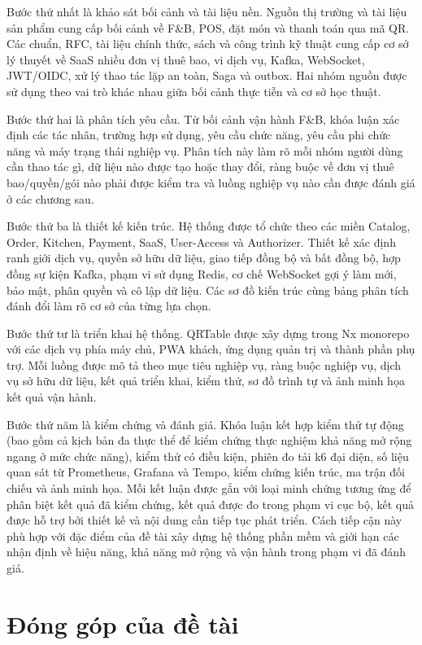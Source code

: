 Bước thứ nhất là khảo sát bối cảnh và tài liệu nền. Nguồn thị trường và tài liệu sản phẩm cung cấp bối cảnh về F\&B, POS, đặt món và thanh toán qua mã QR. Các chuẩn, RFC, tài liệu chính thức, sách và công trình kỹ thuật cung cấp cơ sở lý thuyết về SaaS nhiều đơn vị thuê bao, vi dịch vụ, Kafka, WebSocket, JWT/OIDC, xử lý thao tác lặp an toàn, Saga và outbox. Hai nhóm nguồn được sử dụng theo vai trò khác nhau giữa bối cảnh thực tiễn và cơ sở học thuật.

Bước thứ hai là phân tích yêu cầu. Từ bối cảnh vận hành F\&B, khóa luận xác định các tác nhân, trường hợp sử dụng, yêu cầu chức năng, yêu cầu phi chức năng và máy trạng thái nghiệp vụ. Phân tích này làm rõ mỗi nhóm người dùng cần thao tác gì, dữ liệu nào được tạo hoặc thay đổi, ràng buộc về đơn vị thuê bao/quyền/gói nào phải được kiểm tra và luồng nghiệp vụ nào cần được đánh giá ở các chương sau.

Bước thứ ba là thiết kế kiến trúc. Hệ thống được tổ chức theo các miền Catalog, Order, Kitchen, Payment, SaaS, User-Access và Authorizer. Thiết kế xác định ranh giới dịch vụ, quyền sở hữu dữ liệu, giao tiếp đồng bộ và bất đồng bộ, hợp đồng sự kiện Kafka, phạm vi sử dụng Redis, cơ chế WebSocket gợi ý làm mới, bảo mật, phân quyền và cô lập dữ liệu. Các sơ đồ kiến trúc cùng bảng phân tích đánh đổi làm rõ cơ sở của từng lựa chọn.

Bước thứ tư là triển khai hệ thống. QRTable được xây dựng trong Nx monorepo với các dịch vụ phía máy chủ, PWA khách, ứng dụng quản trị và thành phần phụ trợ. Mỗi luồng được mô tả theo mục tiêu nghiệp vụ, ràng buộc nghiệp vụ, dịch vụ sở hữu dữ liệu, kết quả triển khai, kiểm thử, sơ đồ trình tự và ảnh minh họa kết quả vận hành.

Bước thứ năm là kiểm chứng và đánh giá. Khóa luận kết hợp kiểm thử tự động (bao gồm cả kịch bản đa thực thể để kiểm chứng thực nghiệm khả năng mở rộng ngang ở mức chức năng), kiểm thử có điều kiện, phiên đo tải k6 đại diện, số liệu quan sát từ Prometheus, Grafana và Tempo, kiểm chứng kiến trúc, ma trận đối chiếu và ảnh minh họa. Mỗi kết luận được gắn với loại minh chứng tương ứng để phân biệt kết quả đã kiểm chứng, kết quả được đo trong phạm vi cục bộ, kết quả được hỗ trợ bởi thiết kế và nội dung cần tiếp tục phát triển. Cách tiếp cận này phù hợp với đặc điểm của đề tài xây dựng hệ thống phần mềm và giới hạn các nhận định về hiệu năng, khả năng mở rộng và vận hành trong phạm vi đã đánh giá.

\section{Đóng góp của đề tài}

